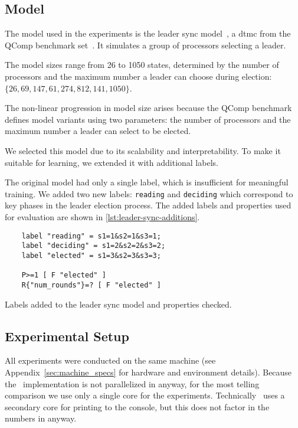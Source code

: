 \subsection{Model}
The model used in the experiments is the leader sync model~\cite{IR90}, a \gls{dtmc} from the QComp benchmark set~\cite{hartmanns2019quantitative}.
It simulates a group of processors selecting a leader.

The model sizes range from 26 to 1050 states, determined by the number of processors and the maximum number a leader can choose during election: $\{26, 69, 147, 61, 274, 812, 141, 1050\}$.

The non-linear progression in model size arises because the QComp benchmark defines model variants using two parameters: the number of processors and the maximum number a leader can select to be elected.

We selected this model due to its scalability and interpretability. To make it suitable for learning, we extended it with additional labels.

The original model had only a single label, which is insufficient for meaningful training.
We added two new labels: \texttt{reading} and \texttt{deciding} which correspond to key phases in the leader election process.
The added labels and properties used for evaluation are shown in \autoref{lst:leader-sync-additions}.

\begin{listing}
    \begin{verbatim}
    label "reading" = s1=1&s2=1&s3=1;
    label "deciding" = s1=2&s2=2&s3=2;
    label "elected" = s1=3&s2=3&s3=3;

    P>=1 [ F "elected" ]
    R{"num_rounds"}=? [ F "elected" ]
    \end{verbatim}
    \caption{Labels added to the leader sync model and properties checked.}
    \label{lst:leader-sync-additions}
\end{listing}

\subsection{Experimental Setup}
All experiments were conducted on the same machine (see Appendix~\ref{sec:machine_specs} for hardware and environment details).
Because the \Cupaal\ implementation is not parallelized in anyway, for the most telling comparison we use only a single core for the experiments.
Technically \Jajapy\ uses a secondary core for printing to the console, but this does not factor in the numbers in anyway.

